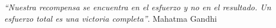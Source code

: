 %
%
\chapter*{}

\begin{flushright}
	{\it ``Nuestra recompensa se encuentra en el esfuerzo y no en el resultado. Un esfuerzo total es una victoria completa''}. Mahatma Gandhi
\end{flushright}
